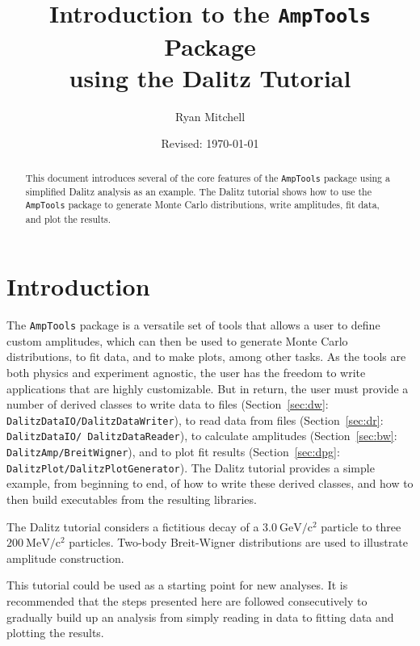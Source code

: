 \documentclass[11pt]{article}
\newcommand{\gevcc}{\mathrm{GeV/c^2}}
\newcommand{\mevcc}{\mathrm{MeV/c^2}}
\begin{document}
\title{Introduction to the {\tt AmpTools} Package\\ using the Dalitz Tutorial}
\author{Ryan Mitchell}
\date{Revised:  \today}
\maketitle 

\begin{abstract}
This document introduces several of the core features of the {\tt AmpTools} package using a simplified Dalitz analysis as an example.  The Dalitz tutorial shows how to use the {\tt AmpTools} package to generate Monte Carlo distributions, write amplitudes, fit data, and plot the results.
\end{abstract}


\tableofcontents

\parindent 0pt
\parskip 10pt


\section{Introduction}

The {\tt AmpTools} package is a versatile set of tools that allows a user to define custom amplitudes, which can then be used to generate Monte Carlo distributions, to fit data, and to make plots, among other tasks.  As the tools are both physics and experiment agnostic, the user has the freedom to write applications that are highly customizable.  But in return, the user must provide a number of derived classes to write data to files (Section~\ref{sec:dw}: {\tt DalitzDataIO/DalitzDataWriter}), to read data from files (Section~\ref{sec:dr}: {\tt DalitzDataIO/ DalitzDataReader}), to calculate amplitudes (Section~\ref{sec:bw}: {\tt DalitzAmp/BreitWigner}), and to plot fit results (Section~\ref{sec:dpg}: {\tt DalitzPlot/DalitzPlotGenerator}).  The Dalitz tutorial provides a simple example, from beginning to end, of how to write these derived classes, and how to then build executables from the resulting libraries.

The Dalitz tutorial considers a fictitious decay of a $3.0~\gevcc$ particle to three $200~\mevcc$ particles.  Two-body Breit-Wigner distributions are used to illustrate amplitude construction.

This tutorial could be used as a starting point for new analyses.  It is recommended that the steps presented here are followed consecutively to gradually build up an analysis from simply reading in data to fitting data and plotting the results.
\end{document}
